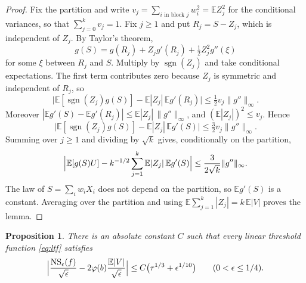 \documentclass[11pt]{amsart}
\newtheorem{proposition}[theorem]{Proposition}
\theoremstyle{remark}
\numberwithin{equation}{section}
\newcommand{\EE}{\mathbb{E}}
\newcommand{\sgnz}{\operatorname{sgn}}
\begin{document}
\begin{proof}
Fix the partition and write $v_j=\sum_{i\text{ in block }j}w_i^2=\EE Z_j^2$ for the conditional variances, so that $\sum_{j=0}^kv_j=1$. Fix $j\ge1$ and put $R_j=S-Z_j$, which is independent of $Z_j$. By Taylor's theorem,
\[
g(S)=g(R_j)+Z_jg'(R_j)+\tfrac12Z_j^2g''(\xi)
\]
for some $\xi$ between $R_j$ and $S$. Multiply by $\sgnz(Z_j)$ and take conditional expectations. The first term contributes zero because $Z_j$ is symmetric and independent of $R_j$, so
\[
\bigl|\EE[\sgnz(Z_j)g(S)]-\EE|Z_j|\,\EE g'(R_j)\bigr|\le\tfrac12v_j\|g''\|_\infty .
\]
Moreover $|\EE g'(S)-\EE g'(R_j)|\le\EE|Z_j|\,\|g''\|_\infty$, and $(\EE|Z_j|)^2\le v_j$. Hence
\[
\bigl|\EE[\sgnz(Z_j)g(S)]-\EE|Z_j|\,\EE g'(S)\bigr|\le\tfrac32v_j\|g''\|_\infty .
\]
Summing over $j\ge1$ and dividing by $\sqrt k$ gives, conditionally on the partition,
\[
\Bigl|\EE[g(S)U]-k^{-1/2}\sum_{j=1}^k\EE|Z_j|\,\EE g'(S)\Bigr|\le\frac{3}{2\sqrt k}\|g''\|_\infty .
\]
The law of $S=\sum_iw_iX_i$ does not depend on the partition, so $\EE g'(S)$ is a constant. Averaging over the partition and using $\EE\sum_{j=1}^k|Z_j|=k\,\EE|V|$ proves the lemma.
\end{proof}

\begin{proposition}\label{prop:regular}
There is an absolute constant $C$ such that every linear threshold function \eqref{eq:ltf} satisfies
\[
\Bigl|\frac{\mathrm{NS}_\epsilon(f)}{\sqrt\epsilon}-2\varphi(b)\frac{\EE|V|}{\sqrt\epsilon}\Bigr|\le C\bigl(\tau^{1/3}+\epsilon^{1/10}\bigr)\qquad(0<\epsilon\le1/4).
\]
\end{proposition}
\end{document}
